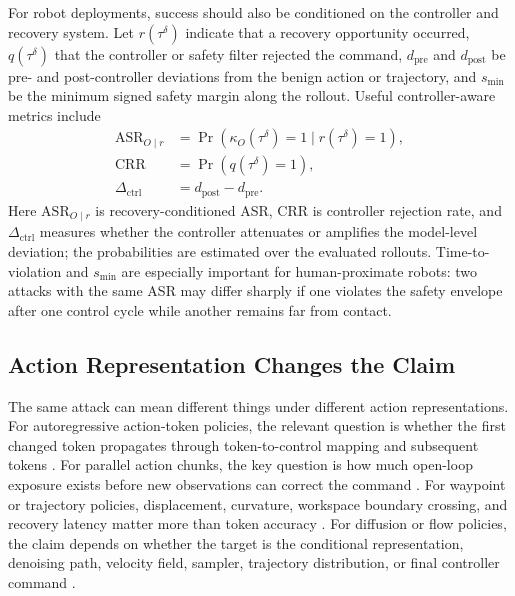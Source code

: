 For robot deployments, success should also be conditioned on the controller and recovery system. Let $r(\tau^\delta)$ indicate that a recovery opportunity occurred, $q(\tau^\delta)$ that the controller or safety filter rejected the command, $d_{\mathrm{pre}}$ and $d_{\mathrm{post}}$ be pre- and post-controller deviations from the benign action or trajectory, and $s_{\min}$ be the minimum signed safety margin along the rollout. Useful controller-aware metrics include
\begin{equation}
\begin{aligned}
    \mathrm{ASR}_{O\mid r}
    &= \Pr\!\left(\kappa_O(\tau^\delta)=1 \mid r(\tau^\delta)=1\right),\\
    \mathrm{CRR}
    &= \Pr\!\left(q(\tau^\delta)=1\right),\\
    \Delta_{\mathrm{ctrl}}
    &= d_{\mathrm{post}} - d_{\mathrm{pre}}.
\end{aligned}
\label{eq:controller-metrics}
\end{equation}
Here $\mathrm{ASR}_{O\mid r}$ is recovery-conditioned ASR, $\mathrm{CRR}$ is controller rejection rate, and $\Delta_{\mathrm{ctrl}}$ measures whether the controller attenuates or amplifies the model-level deviation; the probabilities are estimated over the evaluated rollouts. Time-to-violation and $s_{\min}$ are especially important for human-proximate robots: two attacks with the same ASR may differ sharply if one violates the safety envelope after one control cycle while another remains far from contact.

\subsection{Action Representation Changes the Claim}

The same attack can mean different things under different action representations. For autoregressive action-token policies, the relevant question is whether the first changed token propagates through token-to-control mapping and subsequent tokens \cite{brohan2022rt1,brohan2023rt2,kim24openvla,qu2025spatialvla,pertsch2025fast}. For parallel action chunks, the key question is how much open-loop exposure exists before new observations can correct the command \cite{zhao2023act,kim2025openvlaoft,liu2024rdt}. For waypoint or trajectory policies, displacement, curvature, workspace boundary crossing, and recovery latency matter more than token accuracy \cite{zeng2020transporter,shridhar2022peract,gervet2023act3d,goyal2023rvt}. For diffusion or flow policies, the claim depends on whether the target is the conditional representation, denoising path, velocity field, sampler, trajectory distribution, or final controller command \cite{chi2023diffusion,black2024pi0,ze2024dp3,xian2024diffuseractor,reuss2024mdt}.

